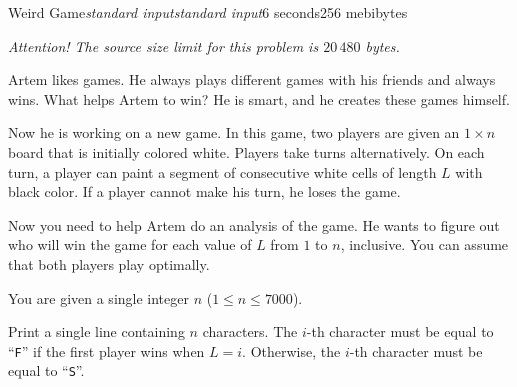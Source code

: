 \begin{problem}{Weird Game}{\textsl{standard input}}{\textsl{standard input}}{6 seconds}{256 mebibytes}{}

\textit{Attention! The source size limit for this problem is $20\,480$ bytes.}

Artem likes games. He always plays different games with his friends and always wins. What helps Artem to win? He is smart, and he creates these games himself.

Now he is working on a new game. In this game, two players are given an $1 \times n$ board that is initially colored white. Players take turns alternatively. On each turn, a player can paint a segment of consecutive white cells of length $L$ with black color. If a player cannot make his turn, he loses the game.

Now you need to help Artem do an analysis of the game. He wants to figure out who will win the game for each value of $L$ from $1$ to $n$, inclusive. You can assume that both players play optimally.

\InputFile
You are given a single integer $n$ ($1 \le n \le 7000$).

\OutputFile
Print a single line containing $n$ characters. The $i$-th character must be equal to ``\texttt{F}'' if the first player wins when $L = i$. Otherwise, the $i$-th character must be equal to ``\texttt{S}''.

\Examples

\begin{example}
%
%
\end{example}

\end{problem}
